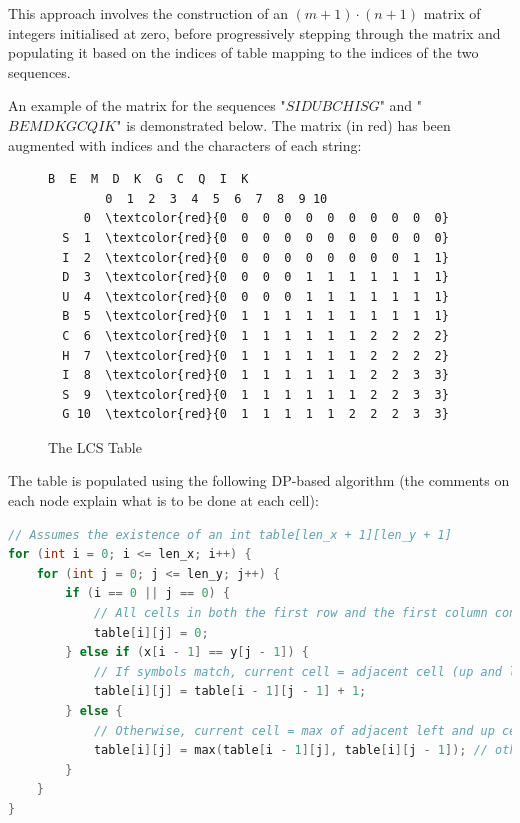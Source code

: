 This approach involves the construction of an $(m+1) \cdot (n+1)$ matrix of integers initialised at zero, before progressively stepping through the matrix and populating it based on the indices of table mapping to the indices of the two sequences.

An example of the matrix for the sequences "$SIDUBCHISG$" and "$BEMDKGCQIK$" is demonstrated below. The matrix (in red) has been augmented with indices and the characters of each string:

\begin{figure}[H]
\centering
\begin{BVerbatim}[commandchars=\\\{\}]
           B  E  M  D  K  G  C  Q  I  K
        0  1  2  3  4  5  6  7  8  9 10
     0  \textcolor{red}{0  0  0  0  0  0  0  0  0  0  0}
  S  1  \textcolor{red}{0  0  0  0  0  0  0  0  0  0  0}
  I  2  \textcolor{red}{0  0  0  0  0  0  0  0  0  1  1}
  D  3  \textcolor{red}{0  0  0  0  1  1  1  1  1  1  1}
  U  4  \textcolor{red}{0  0  0  0  1  1  1  1  1  1  1}
  B  5  \textcolor{red}{0  1  1  1  1  1  1  1  1  1  1}
  C  6  \textcolor{red}{0  1  1  1  1  1  1  2  2  2  2}
  H  7  \textcolor{red}{0  1  1  1  1  1  1  2  2  2  2}
  I  8  \textcolor{red}{0  1  1  1  1  1  1  2  2  3  3}
  S  9  \textcolor{red}{0  1  1  1  1  1  1  2  2  3  3}
  G 10  \textcolor{red}{0  1  1  1  1  1  2  2  2  3  3}
\end{BVerbatim}
\caption{The LCS Table \label{fig:table}}
\end{figure}

The table is populated using the following DP-based algorithm (the comments on each node explain what is to be done at each cell):

\begin{lstlisting}[language=C++, caption=LCS Algoritm]
// Assumes the existence of an int table[len_x + 1][len_y + 1]
for (int i = 0; i <= len_x; i++) {
    for (int j = 0; j <= len_y; j++) {
        if (i == 0 || j == 0) { 
            // All cells in both the first row and the first column contain zero.
            table[i][j] = 0;
        } else if (x[i - 1] == y[j - 1]) { 
            // If symbols match, current cell = adjacent cell (up and left) + 1
            table[i][j] = table[i - 1][j - 1] + 1;
        } else {
            // Otherwise, current cell = max of adjacent left and up cells
            table[i][j] = max(table[i - 1][j], table[i][j - 1]); // otherwise
        }
    }
}
\end{lstlisting}

